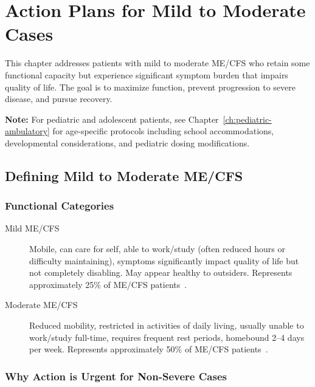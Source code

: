 \chapter{Action Plans for Mild to Moderate Cases}
\label{ch:action-mild-moderate}

This chapter addresses patients with mild to moderate ME/CFS who retain some functional capacity but experience significant symptom burden that impairs quality of life. The goal is to maximize function, prevent progression to severe disease, and pursue recovery.

\textbf{Note:} For pediatric and adolescent patients, see Chapter~\ref{ch:pediatric-ambulatory} for age-specific protocols including school accommodations, developmental considerations, and pediatric dosing modifications.

\section{Defining Mild to Moderate ME/CFS}
\label{sec:defining-mild-moderate}

\subsection{Functional Categories}

\begin{description}
    \item[Mild ME/CFS] Mobile, can care for self, able to work/study (often reduced hours or difficulty maintaining), symptoms significantly impact quality of life but not completely disabling. May appear healthy to outsiders. Represents approximately 25\% of ME/CFS patients~\cite{Rowe2017pediatric}.

    \item[Moderate ME/CFS] Reduced mobility, restricted in activities of daily living, usually unable to work/study full-time, requires frequent rest periods, homebound 2--4 days per week. Represents approximately 50\% of ME/CFS patients~\cite{Rowe2017pediatric}.
\end{description}

\subsection{Why Action is Urgent for Non-Severe Cases}

